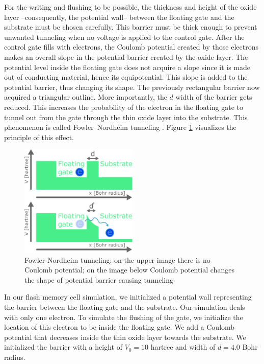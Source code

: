 For the writing and flushing to be possible, the thickness and height of the oxide layer --consequently, the potential wall-- between the floating gate and the substrate must be chosen carefully.
This barrier must be thick enough to prevent unwanted tunneling when no voltage is applied to the control gate.
After the control gate fills with electrons, the Coulomb potential created by those electrons makes an overall slope in the potential barrier created by the oxide layer.
The potential level inside the floating gate does not acquire a slope since it is made out of conducting material, hence its equipotential.
This slope is added to the potential barrier, thus changing its shape.
The previously rectangular barrier now acquired a triangular outline. More importantly, the $d$ width of the barrier gets reduced.
This increases the probability of the electron in the floating gate to tunnel out from the gate through the thin oxide layer into the substrate.
This phenomenon is called Fowler–Nordheim tunneling \cite{Fowler_1928bv}.
Figure \ref{fig:fowler_nordheim_tunneling} visualizes the principle of this effect.
\begin{figure}
	\centering
	\includegraphics[width=0.5\textwidth]{figures/fowler_nordheim_tunneling.pdf}
	\caption{Fowler-Nordheim tunneling: on the upper image there is no Coulomb potential; on the image below Coulomb potential changes the shape of potential barrier causing tunneling}
	\label{fig:fowler_nordheim_tunneling}
\end{figure}
In our flash memory cell simulation, we initialized a potential wall representing the barrier between the floating gate and the substrate.
Our simulation deals with only one electron.
To simulate the flushing of the gate, we initialize the location of this electron to be inside the floating gate.
We add a Coulomb potential that decreases inside the thin oxide layer towards the substrate.
We initialized the barrier with a height of $V_0 = 10$ hartree and width of $d = 4.0$ Bohr radius.
